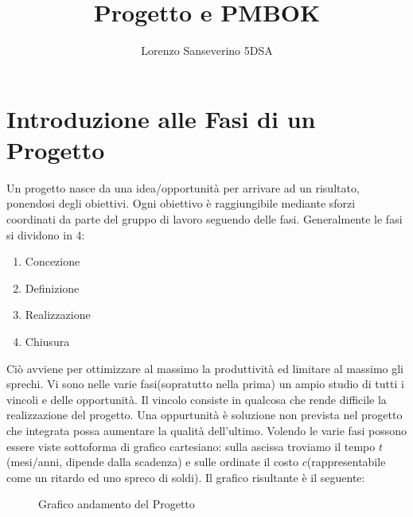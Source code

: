 \documentclass{report}
\title{Progetto e PMBOK}
\author{Lorenzo Sanseverino 5DSA}
\begin{document}
\tableofcontents
\maketitle

\section{Introduzione alle Fasi di un Progetto}
Un progetto nasce da una idea/opportunità per arrivare ad un risultato, ponendosi degli obiettivi.
Ogni obiettivo è raggiungibile mediante sforzi coordinati da parte del gruppo di lavoro seguendo delle fasi.
Generalmente le fasi si dividono in 4:

\begin{enumerate}
\item Concezione
\item Definizione
\item Realizzazione
\item Chiusura	
\end{enumerate}

Ciò avviene per ottimizzare al massimo la produttività ed limitare al massimo gli sprechi.
Vi sono nelle varie fasi(sopratutto nella prima) un ampio studio di tutti i vincoli e delle opportunità.
Il vincolo consiste in qualcosa che rende difficile la realizzazione del progetto.
Una oppurtunità è soluzione non prevista nel progetto che integrata possa aumentare la qualità dell'ultimo.
Volendo le varie fasi possono essere viste sottoforma di grafico cartesiano:
sulla ascissa troviamo il tempo \(t\)(mesi/anni, dipende dalla scadenza) e sulle ordinate il costo \(c\)(rappresentabile come un ritardo ed uno spreco di soldi).
Il grafico risultante è il seguente:
\begin{figure}[h!]
\caption{Grafico andamento del Progetto}
\label{grap1}
\end{figure}
\end{document}
